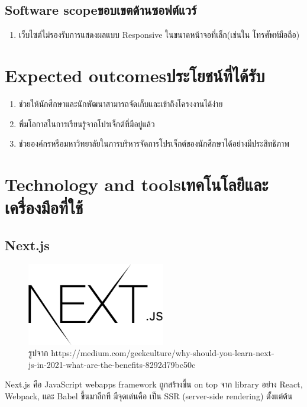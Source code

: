 \subsection{\ifenglish Software scope\else ขอบเขตด้านซอฟต์แวร์\fi}
\begin{enumerate}
  \item เว็บไซต์ไม่รองรับการแสดงผลแบบ Responsive ในขนาดหน้าจอที่เล็ก(เช่นใน โทรศัพท์มือถือ)
\end{enumerate}
\section{\ifenglish Expected outcomes\else ประโยชน์ที่ได้รับ\fi}
\begin{enumerate}
    \item ช่วยให้นักศึกษาและนักพัฒนาสามารถจัดเก็บและเข้าถึงโครงงานได้ง่าย
    \item พิ่มโอกาสในการเรียนรู้จากโปรเจ็กต์ที่มีอยู่แล้ว
    \item ช่วยองค์กรหรือมหาวิทยาลัยในการบริหารจัดการโปรเจ็กต์ของนักศึกษาได้อย่างมีประสิทธิภาพ
\end{enumerate}

\section{\ifenglish Technology and tools\else เทคโนโลยีและเครื่องมือที่ใช้\fi}
\subsection{Next.js}
\begin{figure}[H] %
    \centering
    \includegraphics[width=60mm, keepaspectratio ]{pictures/nextjs.png}
    \caption[Next.js]{รูปจาก https://medium.com/geekculture/why-should-you-learn-next-js-in-2021-what-are-the-benefits-8292d79bc50c}
    \label{fig:nextjs}
\end{figure}
\hspace{1.27cm}Next.js\cite{Nextjs} คือ JavaScript webapps framework ถูกสร้างขึ้น on top จาก library อย่าง React, Webpack, และ Babel ขึ้นมาอีกที มีจุดเด่นคือ เป็น SSR (server-side rendering) ตั้งแต่ต้น
